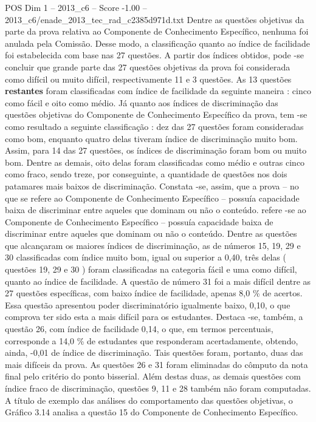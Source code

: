\begin{textsample}{POS Dim 1 – 2013\_c6 – Score -1.00 – 2013\_c6/enade\_2013\_tec\_rad\_c2385d971d.txt}
Dentre as questões objetivas da parte da prova relativa ao Componente de Conhecimento Específico, nenhuma foi anulada pela Comissão.
Desse modo, a classificação quanto ao índice de facilidade foi estabelecida com base nas 27 questões.
A partir dos índices obtidos, pode -se concluir que grande parte das 27 questões objetivas da prova foi considerada como difícil ou muito difícil, respectivamente 11 e 3 questões.
As 13 questões \textbf{restantes} foram classificadas com índice de facilidade da seguinte maneira : cinco como fácil e oito como médio.
Já quanto aos índices de discriminação das questões objetivas do Componente de Conhecimento Específico da prova, tem -se como resultado a seguinte classificação : dez das 27 questões foram consideradas como bom, enquanto quatro delas tiveram índice de discriminação muito bom.
Assim, para 14 das 27 questões, os índices de discriminação foram bom ou muito bom.
Dentre as demais, oito delas foram classificadas como médio e outras cinco como fraco, sendo treze, por conseguinte, a quantidade de questões nos dois patamares mais baixos de discriminação.
Constata -se, assim, que a prova – no que se refere ao Componente de Conhecimento Específico – possuía capacidade baixa de discriminar entre aqueles que dominam ou não o conteúdo. refere -se ao Componente de Conhecimento Específico – possuía capacidade baixa de discriminar entre aqueles que dominam ou não o conteúdo.
Dentre as questões que alcançaram os maiores índices de discriminação, as de números 15, 19, 29 e 30 classificadas com índice muito bom, igual ou superior a 0,40, três delas ( questões 19, 29 e 30 ) foram classificadas na categoria fácil e uma como difícil, quanto ao índice de facilidade.
A questão de número 31 foi a mais difícil dentre as 27 questões específicas, com baixo índice de facilidade, apenas 8,0 \% de acertos.
Essa questão apresentou poder discriminatório igualmente baixo, 0,10, o que comprova ter sido esta a mais difícil para os estudantes.
Destaca -se, também, a questão 26, com índice de facilidade 0,14, o que, em termos percentuais, corresponde a 14,0 \% de estudantes que responderam acertadamente, obtendo, ainda, -0,01 de índice de discriminação.
Tais questões foram, portanto, duas das mais difíceis da prova.
As questões 26 e 31 foram eliminadas do cômputo da nota final pelo critério do ponto bisserial.
Além destas duas, as demais questões com índice fraco de discriminação, questões 9, 11 e 28 também não foram computadas.
A título de exemplo das análises do comportamento das questões objetivas, o Gráfico 3.14 analisa a questão 15 do Componente de Conhecimento Específico.

\end{textsample}

